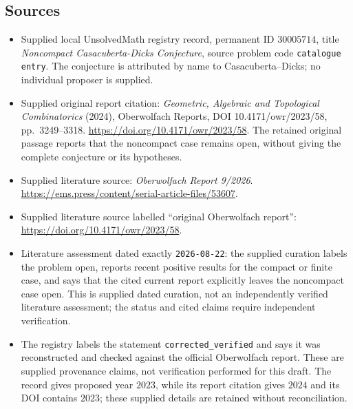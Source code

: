 \documentclass[11pt]{article}
\begin{document}
\subsection{Sources}
\begin{itemize}
\item Supplied local UnsolvedMath registry record, permanent ID \(30005714\), title \emph{Noncompact Casacuberta-Dicks Conjecture}, source problem code \texttt{catalogue entry}. The conjecture is attributed by name to Casacuberta--Dicks; no individual proposer is supplied.
\item Supplied original report citation: \emph{Geometric, Algebraic and Topological Combinatorics} (2024), Oberwolfach Reports, DOI 10.4171/owr/2023/58, pp.\ 3249--3318. \url{https://doi.org/10.4171/owr/2023/58}. The retained original passage reports that the noncompact case remains open, without giving the complete conjecture or its hypotheses.
\item Supplied literature source: \emph{Oberwolfach Report 9/2026}. \url{https://ems.press/content/serial-article-files/53607}.
\item Supplied literature source labelled ``original Oberwolfach report'': \url{https://doi.org/10.4171/owr/2023/58}.
\item Literature assessment dated exactly \texttt{2026-08-22}: the supplied curation labels the problem open, reports recent positive results for the compact or finite case, and says that the cited current report explicitly leaves the noncompact case open. This is supplied dated curation, not an independently verified literature assessment; the status and cited claims require independent verification.
\item The registry labels the statement \texttt{corrected\_verified} and says it was reconstructed and checked against the official Oberwolfach report. These are supplied provenance claims, not verification performed for this draft. The record gives proposed year \(2023\), while its report citation gives \(2024\) and its DOI contains \(2023\); these supplied details are retained without reconciliation.
\end{itemize}
\end{document}

